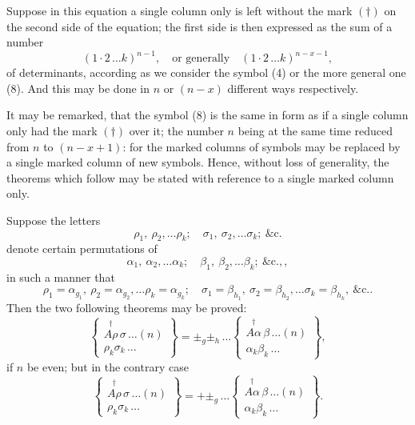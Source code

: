 \documentclass[11pt,a4paper]{article}
\theoremstyle{plain}
\theoremstyle{definition}
\theoremstyle{remark}
\begin{document}
Suppose in this equation a single column only is left without the mark $(\dagger)$ on
the second side of the equation; the first side is then expressed as the sum of a number
\[
(1\cdot 2\,\ldots k)^{n-1},\quad\text{or generally}\quad (1\cdot 2\,\ldots k)^{n-x-1}\tag{13},
\]
of determinants, according as we consider the symbol (4) or the more general one (8).
And this may be done in $n$ or $(n-x)$ different ways respectively.

\newpage

It may be remarked, that the symbol (8) is the same in form as if a single
column only had the mark $(\dagger)$ over it; the number $n$ being at the same time
reduced from $n$ to $(n-x+1)$: for the marked columns of symbols may be replaced
by a single marked column of new symbols. Hence, without loss of generality, the
theorems which follow may be stated with reference to a single marked column only.

Suppose the letters
\[
\rho_1,\ \rho_2,\ldots \rho_k;\quad \sigma_1,\ \sigma_2,\ldots \sigma_k;\ \&\text{c.}
\tag{14}
\]
denote certain permutations of
\[
\alpha_1,\ \alpha_2,\ldots \alpha_k;\quad \beta_1,\ \beta_2,\ldots \beta_k;\ \&\text{c.},
\tag{15},
\]
in such a manner that
\[
\rho_1=\alpha_{g_1},\ \rho_2=\alpha_{g_2},\ldots\rho_k=\alpha_{g_k};\quad
\sigma_1=\beta_{h_1},\ \sigma_2=\beta_{h_2},\ldots\sigma_k=\beta_{h_k},\ \&\text{c.}
\tag{16}.
\]
Then the two following theorems may be proved:
\[
\left\{
\begin{array}{c}
\stackrel{\dagger}{A\rho}\,\sigma\,\ldots(n) \\[2pt]
\hline
\rho_k\sigma_k\,\ldots
\end{array}
\right\}
= \pm_g\pm_h\,\ldots
\left\{
\begin{array}{c}
\stackrel{\dagger}{A\alpha}\,\beta\,\ldots(n) \\[2pt]
\hline
\alpha_k\beta_k\,\ldots
\end{array}
\right\}
\tag{17},
\]
if $n$ be even; but in the contrary case
\[
\left\{
\begin{array}{c}
\stackrel{\dagger}{A\rho}\,\sigma\,\ldots(n) \\[2pt]
\hline
\rho_k\sigma_k\,\ldots
\end{array}
\right\}
= +\pm_g\,\ldots
\left\{
\begin{array}{c}
\stackrel{\dagger}{A\alpha}\,\beta\,\ldots(n) \\[2pt]
\hline
\alpha_k\beta_k\,\ldots
\end{array}
\right\}
\tag{18}.
\]
\end{document}
